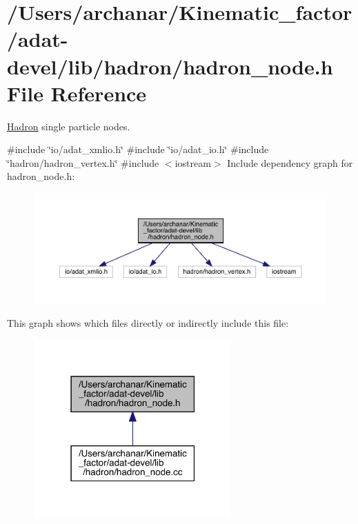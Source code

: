 \hypertarget{adat-devel_2lib_2hadron_2hadron__node_8h}{}\section{/\+Users/archanar/\+Kinematic\+\_\+factor/adat-\/devel/lib/hadron/hadron\+\_\+node.h File Reference}
\label{adat-devel_2lib_2hadron_2hadron__node_8h}


\mbox{\hyperlink{namespaceHadron}{Hadron}} single particle nodes.  


{\ttfamily \#include \char`\"{}io/adat\+\_\+xmlio.\+h\char`\"{}}\newline
{\ttfamily \#include \char`\"{}io/adat\+\_\+io.\+h\char`\"{}}\newline
{\ttfamily \#include \char`\"{}hadron/hadron\+\_\+vertex.\+h\char`\"{}}\newline
{\ttfamily \#include $<$iostream$>$}\newline
Include dependency graph for hadron\+\_\+node.\+h\+:
\nopagebreak
\begin{figure}[H]
\begin{center}
\leavevmode
\includegraphics[width=350pt]{d7/d1f/adat-devel_2lib_2hadron_2hadron__node_8h__incl}
\end{center}
\end{figure}
This graph shows which files directly or indirectly include this file\+:
\nopagebreak
\begin{figure}[H]
\begin{center}
\leavevmode
\includegraphics[width=214pt]{de/d44/adat-devel_2lib_2hadron_2hadron__node_8h__dep__incl}
\end{center}
\end{figure}
